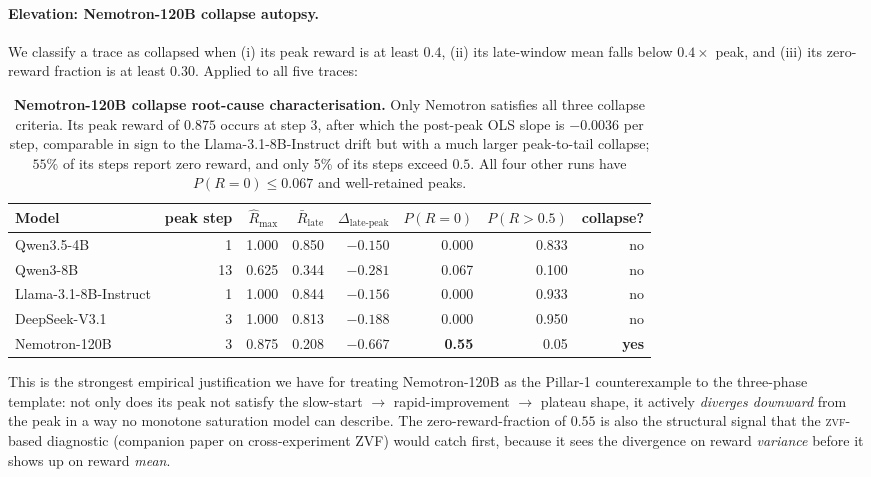 \documentclass{article}
\begin{document}
\paragraph{Elevation: Nemotron-120B collapse autopsy.}
\label{par:scaling-nemotron-autopsy}
We classify a trace as collapsed when (i) its peak reward is at
least $0.4$, (ii) its late-window mean falls below $0.4 \times$
peak, and (iii) its zero-reward fraction is at least $0.30$.
Applied to all five traces:

\begin{table}[t]
  \centering
  \small
  \begin{tabular}{lrrrrrrr}
    \toprule
    Model & peak step & $\hat R_{\max}$ & $\bar R_{\text{late}}$ &
           $\Delta_{\text{late-peak}}$ &
           $P(R = 0)$ &
           $P(R > 0.5)$ & collapse? \\
    \midrule
    Qwen3.5-4B            &  1 & 1.000 & 0.850 & $-0.150$ & 0.000 & 0.833 & no \\
    Qwen3-8B              & 13 & 0.625 & 0.344 & $-0.281$ & 0.067 & 0.100 & no \\
    Llama-3.1-8B-Instruct &  1 & 1.000 & 0.844 & $-0.156$ & 0.000 & 0.933 & no \\
    DeepSeek-V3.1         &  3 & 1.000 & 0.813 & $-0.188$ & 0.000 & 0.950 & no \\
    Nemotron-120B         &  3 & 0.875 & 0.208 & $\mathbf{-0.667}$ & \textbf{0.55} & 0.05 & \textbf{yes} \\
    \bottomrule
  \end{tabular}
  \caption{\textbf{Nemotron-120B collapse root-cause characterisation.}
    Only Nemotron satisfies all three collapse criteria.  Its peak
    reward of $0.875$ occurs at step 3, after which the post-peak
    OLS slope is $-0.0036$ per step, comparable in sign to the
    Llama-3.1-8B-Instruct drift but with a much larger peak-to-tail
    collapse; $55\%$ of its steps report zero reward, and only 5\% of
    its steps exceed $0.5$.  All four other runs have
    $P(R = 0) \le 0.067$ and well-retained peaks.}
  \label{tab:scaling-nemotron-autopsy}
\end{table}

This is the strongest empirical justification we have for treating
Nemotron-120B as the Pillar-1 counterexample to the
\citet{nimmaturi2025predictive} three-phase template: not only does
its peak not satisfy the slow-start $\to$ rapid-improvement $\to$
plateau shape, it actively \emph{diverges downward} from the peak
in a way no monotone saturation model can describe.  The
zero-reward-fraction of $0.55$ is also the structural signal that
the \textsc{zvf}-based diagnostic
(companion paper on cross-experiment ZVF) would catch first, because it
sees the divergence on reward \emph{variance} before it shows up on
reward \emph{mean}.
\end{document}
